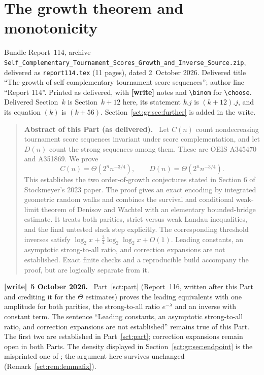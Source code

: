 \documentclass[11pt,letterpaper]{article}
\newcommand{\file}[1]{\nolinkurl{#1}}
\theoremstyle{definition}\newtheorem{remark}[theorem]{Remark}
\newenvironment{writenote}[1][]{\par\smallskip\begingroup\small
 \noindent\textbf{[write]}\if\relax\detokenize{#1}\relax\else~\textbf{#1.}\fi\ }%
 {\par\endgroup\smallskip}
\newenvironment{partabstract}{\begin{quote}\small\noindent\textbf{Abstract of this Part (as delivered).}\ }{\end{quote}}
\newcommand{\partsource}[1]{\par\noindent\begin{minipage}{\textwidth}\small #1\end{minipage}\par\medskip}
\begin{document}
\clearpage
\part{The growth theorem and monotonicity}\label{sct:gr:part}
\partsource{Bundle Report~114, archive \file{Self_Complementary_Tournament_Scores_Growth_and_Inverse_Source.zip}, delivered as \file{report114.tex} (11 pages), dated 2~October 2026. Delivered title ``The growth of self complementary tournament score sequences''; author line ``Report 114''. Printed as delivered, with \textbf{[write]} notes and \texttt{\textbackslash binom} for \texttt{\textbackslash choose}. Delivered Section~$k$ is Section~$k+12$ here, its statement $k.j$ is $(k+12).j$, and its equation $(k)$ is $(k+56)$. Section~\ref{sct:gr:sec:further} is added in the write.}
\begin{partabstract}
Let $C(n)$ count nondecreasing tournament score sequences invariant under
score complementation, and let $D(n)$ count the strong sequences among them.
These are OEIS A345470 and A351869. We prove
\[
 C(n)=\Theta\!\left(2^n n^{-3/4}\right),\qquad
 D(n)=\Theta\!\left(2^n n^{-3/4}\right).
\]
This establishes the two order-of-growth conjectures stated in Section 6 of
Stockmeyer's 2023 paper. The proof gives an exact encoding by integrated
geometric random walks and combines the survival and conditional weak-limit
theorem of Denisov and Wachtel with an elementary bounded-bridge estimate.
It treats both parities, strict versus weak Landau inequalities, and the final
untested slack step explicitly. The corresponding threshold inverses satisfy
$\log_2 x+\tfrac34\log_2\log_2 x+O(1)$.
Leading constants, an asymptotic strong-to-all ratio, and correction expansions
are not established. Exact finite checks and a reproducible build accompany
the proof, but are logically separate from it.
\end{partabstract}
\begin{writenote}[5 October 2026]
Part~\ref{sct:part} (Report~116, written after this Part and crediting it for the $\Theta$ estimates) proves the leading equivalents with one amplitude for both parities, the strong-to-all ratio $e^{-\lambda}$ and an inverse with constant term. The sentence ``Leading constants, an asymptotic strong-to-all ratio, and correction expansions are not established'' remains true of this Part. The first two are established in Part~\ref{sct:part}; correction expansions remain open in both Parts. The density displayed in Section~\ref{sct:gr:sec:endpoint} is the misprinted one of \cite{dw}; the argument here survives unchanged (Remark~\ref{sct:rem:lemmafix}).
\end{writenote}
\end{document}
